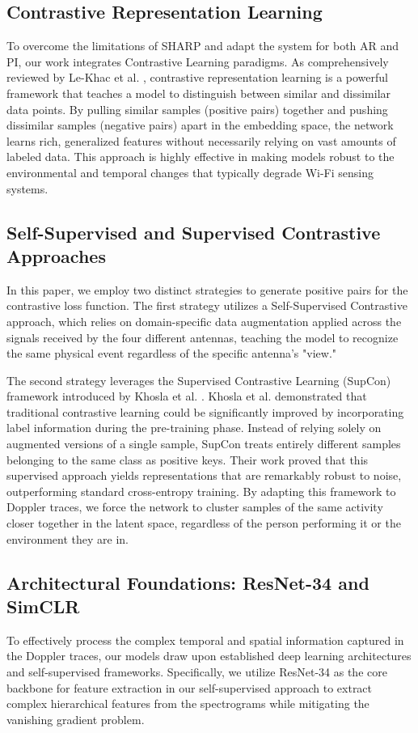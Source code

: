 \subsection{Contrastive Representation Learning}
To overcome the limitations of SHARP and adapt the system for both AR and PI, our work integrates Contrastive Learning paradigms. As comprehensively reviewed by Le-Khac et al. \cite{contrastive}, contrastive representation learning is a powerful framework that teaches a model to distinguish between similar and dissimilar data points. By pulling similar samples (positive pairs) together and pushing dissimilar samples (negative pairs) apart in the embedding space, the network learns rich, generalized features without necessarily relying on vast amounts of labeled data. This approach is highly effective in making models robust to the environmental and temporal changes that typically degrade Wi-Fi sensing systems.

\subsection{Self-Supervised and Supervised Contrastive Approaches}

In this paper, we employ two distinct strategies to generate positive pairs for the contrastive loss function. The first strategy utilizes a Self-Supervised Contrastive approach, which relies on domain-specific data augmentation applied across the signals received by the four different antennas, teaching the model to recognize the same physical event regardless of the specific antenna's "view."

The second strategy leverages the Supervised Contrastive Learning (SupCon) framework introduced by Khosla et al. \cite{supcon}. Khosla et al. demonstrated that traditional contrastive learning could be significantly improved by incorporating label information during the pre-training phase. Instead of relying solely on augmented versions of a single sample, SupCon treats entirely different samples belonging to the same class as positive keys. Their work proved that this supervised approach yields representations that are remarkably robust to noise, outperforming standard cross-entropy training. By adapting this framework to Doppler traces, we force the network to cluster samples of the same activity closer together in the latent space, regardless of the person performing it or the environment they are in.

\subsection{Architectural Foundations: ResNet-34 and SimCLR}
To effectively process the complex temporal and spatial information captured in the Doppler traces, our models draw upon established deep learning architectures and self-supervised frameworks. Specifically, we utilize ResNet-34 \cite{ResNet-34} as the core backbone for feature extraction in our self-supervised approach to extract complex hierarchical features from the spectrograms while mitigating the vanishing gradient problem.

